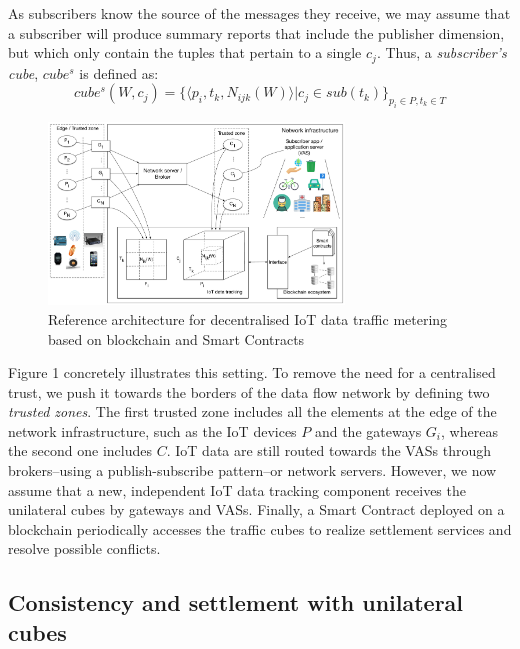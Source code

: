 \documentclass[chi_draft]{sigchi}
\begin{document}
As subscribers know the source of the messages they receive, we may assume that a subscriber will produce summary reports that include the publisher dimension, but which only contain the tuples that pertain to a single $c_j$. Thus, a \textit{subscriber's cube}, $ \mathit{cube^s} $ is defined as:
\[
\mathit{cube^s}(W, c_j)  =  \{ \langle p_i, t_k, N_{ijk}(W) \rangle | c_j \in \mathit{sub}(t_k)\}_{p_i \in P, t_k \in T}
\]

\begin{figure}[!ht]
	\centering
	\includegraphics[width=0.7\textwidth]{figures/IoT-tracking-arch-2}
	\caption{Reference architecture for decentralised IoT data traffic metering based on blockchain and Smart Contracts}
	\label{fig:iot-tracking-arch-2}
\end{figure}

Figure 1 concretely illustrates this setting. To remove the need for a centralised trust, we push it towards the borders of the data flow network by defining two \textit{trusted zones}.
The first trusted zone includes all the elements at the edge of the network infrastructure, such as the IoT devices $P$ and the gateways $ G_i $, whereas the second one includes $ C $.
IoT data are still routed towards the VASs through brokers--using a publish-subscribe pattern--or network servers.
However, we now assume that a new, independent IoT data tracking component  receives the unilateral cubes by gateways and VASs.
Finally, a Smart Contract deployed on a blockchain periodically accesses the traffic cubes to realize settlement services and resolve possible conflicts.

\subsection{Consistency and settlement with unilateral cubes}
\end{document}
